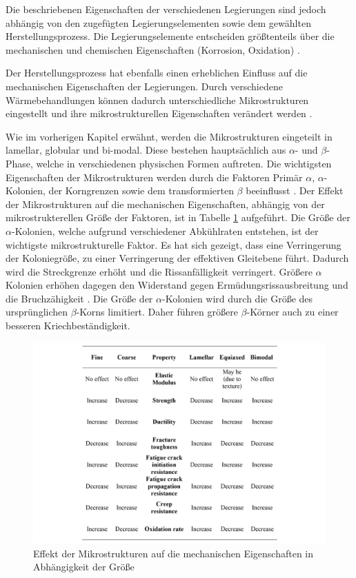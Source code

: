 Die beschriebenen Eigenschaften der verschiedenen Legierungen sind jedoch abhängig von den zugefügten Legierungselementen sowie dem gewählten Herstellungsprozess.
Die Legierungselemente entscheiden größtenteils über die mechanischen und chemischen Eigenschaften (Korrosion, Oxidation) \cite{C.Leyens.2005,Lutjering.2007,M.J.Donachie.2010}.

Der Herstellungsprozess hat ebenfalls einen erheblichen Einfluss auf die mechanischen Eigenschaften der Legierungen. Durch verschiedene Wärmebehandlungen können dadurch unterschiedliche Mikrostrukturen eingestellt und ihre mikrostrukturellen Eigenschaften verändert werden \cite{C.Leyens.2005,Lutjering.2007,Boyer.2007,M.J.Donachie.2010}.

Wie im vorherigen Kapitel erwähnt, werden die Mikrostrukturen eingeteilt in lamellar, globular und bi-modal. Diese bestehen hauptsächlich aus $\alpha$- und $\beta$-Phase, welche in verschiedenen physischen Formen auftreten. Die wichtigsten Eigenschaften der Mikrostrukturen werden durch die Faktoren Primär $\alpha$, $\alpha$-Kolonien, der Korngrenzen sowie dem transformierten $\beta$ beeinflusst \cite{C.Leyens.2005,Lutjering.2007,Boyer.2007}. Der Effekt der Mikrostrukturen auf die mechanischen Eigenschaften, abhängig von der mikrostrukterellen Größe der Faktoren, ist in Tabelle \ref{fig:tabelle-3} aufgeführt. Die Größe der $\alpha$-Kolonien, welche aufgrund verschiedener Abkühlraten entstehen, ist der wichtigste mikrostrukturelle Faktor. Es hat sich gezeigt, dass eine Verringerung der Koloniegröße, zu einer Verringerung der effektiven Gleitebene führt. Dadurch wird die Streckgrenze erhöht und die Rissanfälligkeit verringert. Größere $\alpha$ Kolonien erhöhen dagegen den Widerstand gegen Ermüdungsrissausbreitung und die Bruchzähigkeit \cite{C.Leyens.2005,Lutjering.2007,M.J.Donachie.2010}. Die Größe der $\alpha$-Kolonien wird durch die Größe des ursprünglichen $\beta$-Korns limitiert. Daher führen größere $\beta$-Körner auch zu einer besseren Kriechbeständigkeit.

\begin{figure}[h]
	\centering
	\includegraphics[width=0.9\linewidth]{./Bilder/Tabelle 3.png}
	\caption[Tabelle]{Effekt der Mikrostrukturen auf die mechanischen Eigenschaften in Abhängigkeit der Größe \cite{Boyer.2007}}
	\label{fig:tabelle-3}
\end{figure}

